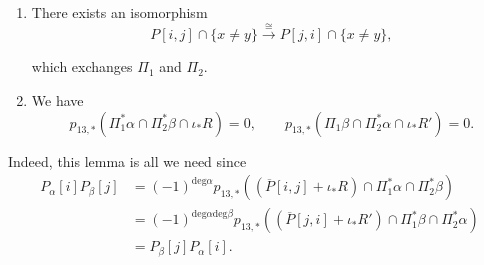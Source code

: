 \begin{lemma}
\label{lemma-pij}
\begin{enumerate}
\item There exists an isomorphism
\begin{equation}
\label{equation-pij-isomorphism}
P[i,j]\cap\{x \neq y\}\xrightarrow{\cong}P[j,i]\cap \{x \neq y\},
\end{equation}

\noindent
which exchanges $\Pi_1$ and $\Pi_2$.

\item We have
\begin{equation}
\label{equation-r}
p_{13,*}(\Pi_1^*\alpha\cap\Pi_2^*\beta\cap\iota_*R)=0,\qquad 
p_{13,*}(\Pi_1\beta\cap\Pi_2^*\alpha\cap\iota_*R')=0.
\end{equation}
\end{enumerate}
\end{lemma}

\noindent
Indeed, this lemma is all we need since
\begin{align*}
P_\alpha[i]P_\beta[j]
&=(-1)^{\text{deg}\alpha}p_{13,*}((\overline{P}[i,j]+\iota_*R)\cap\Pi_1^*\alpha\cap\Pi_2^*\beta)\\
&=(-1)^{\text{deg}\alpha\text{deg}\beta}
p_{13,*}((\overline{P}[j,i]+\iota_*R')\cap\Pi_1^*\beta\cap\Pi_2^*\alpha)\\
&=P_\beta[j]P_\alpha[i].
\end{align*}

